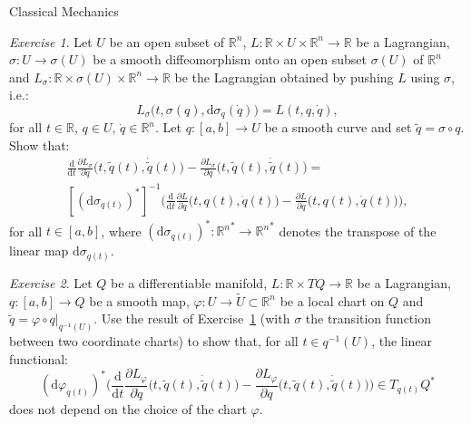 \documentclass[oneside,a4paper,11pt]{amsbook}
\newcommand{\R}{\mathds R}
\newcommand{\dd}{\mathrm d}
\theoremstyle{remark}\newtheorem{exercise}{Exercise}[chapter]
\theoremstyle{plain}\newtheorem{teo}{Theorem}[section]
\theoremstyle{plain}\newtheorem{lem}[teo]{Lemma}
\theoremstyle{plain}\newtheorem{prop}[teo]{Proposition}
\theoremstyle{plain}\newtheorem{cor}[teo]{Corollary}
\theoremstyle{definition}\newtheorem{defin}[teo]{Definition}
\theoremstyle{remark}\newtheorem{rem}[teo]{Remark}
\theoremstyle{definition}\newtheorem{notation}[teo]{Notation}
\theoremstyle{definition}\newtheorem{convention}[teo]{Convention}
\theoremstyle{definition}\newtheorem{example}[teo]{Example}
\numberwithin{section}{chapter}
\numberwithin{equation}{section}
\begin{document}
\begin{chapter}{Classical Mechanics}
\begin{exercise}\label{exe:transfLag1}
Let $U$ be an open subset of $\R^n$, $L:\R\times U\times\R^n\to\R$ be a Lagrangian, $\sigma:U\to\sigma(U)$
be a smooth diffeomorphism onto an open subset $\sigma(U)$ of $\R^n$ and $L_\sigma:\R\times\sigma(U)\times\R^n\to\R$
be the Lagrangian obtained by pushing $L$ using $\sigma$, i.e.:
\[L_\sigma\big(t,\sigma(q),\dd\sigma_q(\dot q)\big)=L(t,q,\dot q),\]
for all $t\in\R$, $q\in U$, $\dot q\in\R^n$.
Let $q:[a,b]\to U$ be a smooth curve and set $\tilde q=\sigma\circ q$. Show that:
\begin{multline*}
\frac{\dd}{\dd t}\frac{\partial L_\sigma}{\partial\dot q}\big(t,\tilde q(t),\dot{\tilde q}(t)\big)-
\frac{\partial L_\sigma}{\partial q}\big(t,\tilde q(t),\dot{\tilde q}(t)\big)=\\
[(\dd\sigma_{q(t)})^*]^{-1}\Big(\frac{\dd}{\dd t}\frac{\partial L}{\partial\dot q}\big(t,q(t),\dot q(t)\big)-
\frac{\partial L}{\partial q}\big(t,q(t),\dot q(t)\big)\Big),
\end{multline*}
for all $t\in[a,b]$, where $(\dd\sigma_{q(t)})^*:{\R^n}^*\to{\R^n}^*$ denotes the transpose of the linear
map $\dd\sigma_{q(t)}$.
\end{exercise}

\begin{exercise}\label{exe:transfLag2}
Let $Q$ be a differentiable manifold, $L:\R\times TQ\to\R$ be a Lagrangian, $q:[a,b]\to Q$ be a smooth map,
$\varphi:U\to\widetilde U\subset\R^n$ be a local chart on $Q$ and $\tilde q=\varphi\circ q\vert_{q^{-1}(U)}$. Use
the result of Exercise~\ref{exe:transfLag1} (with $\sigma$ the transition function between two coordinate charts)
to show that, for all $t\in q^{-1}(U)$, the linear functional:
\[(\dd\varphi_{q(t)})^*\Big(\frac{\dd}{\dd t}\frac{\partial L_\varphi}{\partial\dot q}
\big(t,\tilde q(t),\dot{\tilde q}(t)\big)-\frac{\partial L_\varphi}{\partial q}
\big(t,\tilde q(t),\dot{\tilde q}(t)\big)\Big)\in T_{q(t)}Q^*\]
does not depend on the choice of the chart $\varphi$.
\end{exercise}


\end{chapter}
\end{document}
